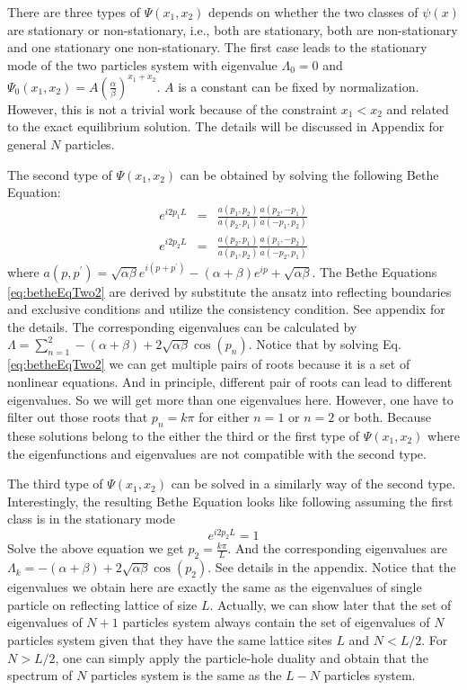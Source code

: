 \documentclass[aps,showpacs,twocolumn,floatfix,prx,superscriptaddress]{revtex4-1}
\begin{document}
There are three types of $\Psi(x_1, x_2)$ depends on whether the two classes of $\psi(x)$ are stationary or non-stationary, i.e., both are stationary, both are non-stationary and one stationary one non-stationary. The first case leads to the stationary mode of the two particles system with eigenvalue $\Lambda_0 = 0$ and $\Psi_0(x_1, x_2) = A \left(\frac{\alpha}{\beta}\right)^{x_1+x_2}$. $A$ is a constant can be fixed by normalization. However, this is not a trivial work because of the constraint $x_1<x_2$ and related to the exact equilibrium solution. The details will be discussed in Appendix for general $N$ particles.

The second type of $\Psi(x_1, x_2)$ can be obtained by solving the following Bethe Equation:
\begin{subequations}
    \label{eq:betheEqTwo2}
    \begin{eqnarray}
        e^{i2p_1L} & = & \frac{a(p_1, p_2)}{a(p_2, p_1)} 
        \frac{a(p_2, -p_1)}{a(-p_1, p_2)}\\
        e^{i2p_2L} & = & \frac{a(p_2, p_1)}{a(p_1, p_2)} 
        \frac{a(p_1, -p_2)}{a(-p_2, p_1)}
    \end{eqnarray}
\end{subequations}
where $a(p, p^\prime) = \sqrt{\alpha\beta}e^{i(p+p^\prime)}-(\alpha+\beta)e^{ip}+\sqrt{\alpha\beta}$. The Bethe Equations \eqref{eq:betheEqTwo2} are derived by substitute the ansatz into reflecting boundaries and exclusive conditions and utilize the consistency condition. See appendix for the details.
The corresponding eigenvalues can be calculated by $\Lambda = \sum_{n=1}^2 -(\alpha+\beta)+2\sqrt{\alpha\beta}\cos(p_n)$. Notice that by solving Eq. \eqref{eq:betheEqTwo2} we can get multiple pairs of roots because it is a set of nonlinear equations. And in principle, different pair of roots can lead to different eigenvalues. So we will get more than one eigenvalues here. However, one have to filter out those roots that $p_n = k\pi$ for either $n=1$ or $n=2$ or both. Because these solutions belong to the either the third or the first type of $\Psi(x_1, x_2)$ where the eigenfunctions and eigenvalues are not compatible with the second type.

The third type of $\Psi(x_1, x_2)$ can be solved in a similarly way of the second type. Interestingly, the resulting Bethe Equation looks like following assuming the first class is in the stationary mode
\begin{equation}
    \label{eq:betheEqTwo1}
    e^{i2p_2L} = 1
\end{equation}
Solve the above equation we get $p_2 = \frac{k\pi}{L}$. And the corresponding eigenvalues are $\Lambda_k = -(\alpha+\beta)+2\sqrt{\alpha\beta}\cos(p_2)$. See details in the appendix. Notice that the eigenvalues we obtain here are exactly the same as the eigenvalues of single particle on reflecting lattice of size $L$. Actually, we can show later that the set of eigenvalues of $N+1$ particles system always contain the set of eigenvalues of $N$ particles system given that they have the same lattice sites $L$ and $N<L/2$. For $N>L/2$, one can simply apply the particle-hole duality and obtain that the spectrum of $N$ particles system is the same as the $L-N$ particles system.
\end{document}
